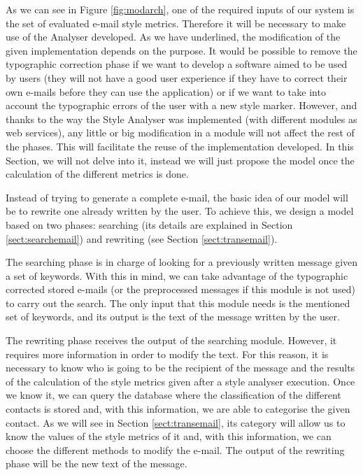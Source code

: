 As we can see in Figure \ref{fig:modarch}, one of the required inputs of our system is the set of evaluated e-mail style metrics. Therefore it will be necessary to make use of the Analyser developed. As we have underlined, the modification of the given implementation depends on the purpose. It would be possible to remove the typographic correction phase if we want to develop a software aimed to be used by users (they will not have a good user experience if they have to correct their own e-mails before they can use the application) or if we want to take into account the typographic errors of the user with a new style marker. However, and thanks to the way the Style Analyser was implemented (with different modules as web services), any little or big modification in a module will not affect the rest of the phases. This will facilitate the reuse of the implementation developed. In this Section, we will not delve into it, instead we will just propose the model once the calculation of the different metrics is done.

Instead of trying to generate a complete e-mail, the basic idea of our model will be to rewrite one already written by the user. To achieve this, we design a model based on two phases: searching (its details are explained in Section \ref{sect:searchemail}) and rewriting (see Section \ref{sect:transemail}).

The searching phase is in charge of looking for a previously written message given a set of keywords. With this in mind, we can take advantage of the typographic corrected stored e-mails (or the preprocessed messages if this module is not used) to carry out the search. The only input that this module needs is the mentioned set of keywords, and its output is the text of the message written by the user.

The rewriting phase receives the output of the searching module. However, it requires more information in order to modify the text. For this reason, it is necessary to know who is going to be the recipient of the message and the results of the calculation of the style metrics given after a style analyser execution. Once we know it, we can query the database where the classification of the different contacts is stored and, with this information, we are able to categorise the given contact. As we will see in Section \ref{sect:transemail}, its category will allow us to know the values of the style metrics of it and, with this information, we can choose the different methods to modify the e-mail. The output of the rewriting phase will be the new text of the message.


